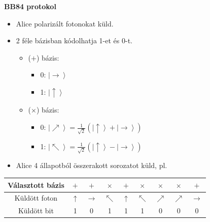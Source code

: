 \documentclass{beamer}
\begin{document}
    \begin{frame}

        \center

        \textbf{BB84 protokol}

        \begin{itemize}
            \item Alice polarizált fotonokat küld.
            \item 2 féle bázisban kódolhatja 1-et és 0-t.
                \begin{itemize}
                    \item ($+$) bázis:
                        \begin{itemize}
                            \item 0: $\left| \rightarrow \right\rangle$
                            \item 1: $\left| \uparrow \right\rangle$
                        \end{itemize}
                    \item ($\times$) bázis:
                        \begin{itemize}
                            \item 0: $\left| \nearrow \right\rangle = \frac{1}{\sqrt{2}} \left( \left| \uparrow \right\rangle + \left| \rightarrow \right\rangle \right)$
                            \item 1: $\left| \nwarrow \right\rangle = \frac{1}{\sqrt{2}} \left( \left| \uparrow \right\rangle - \left| \rightarrow \right\rangle \right)$
                        \end{itemize}
                \end{itemize}
            \item Alice 4 állapotból összerakott sorozatot küld, pl.
        \end{itemize}

        \begin{tabular}{|c|c|c|c|c|c|c|c|c|}
            \hline
            Választott bázis
            & $+$
            & $+$
            & $\times$
            & $+$
            & $\times$
            & $\times$
            & $\times$
            & $+$\\
            \hline
            Küldött foton
            & $\uparrow$
            & $\rightarrow$
            & $\nwarrow$
            & $\uparrow$
            & $\nwarrow$
            & $\nearrow$
            & $\nearrow$
            & $\rightarrow$\\
            \hline
            Küldött bit
            & 1
            & 0
            & 1
            & 1
            & 1
            & 0
            & 0
            & 0\\
            \hline
        \end{tabular}

    \end{frame}
\end{document}
